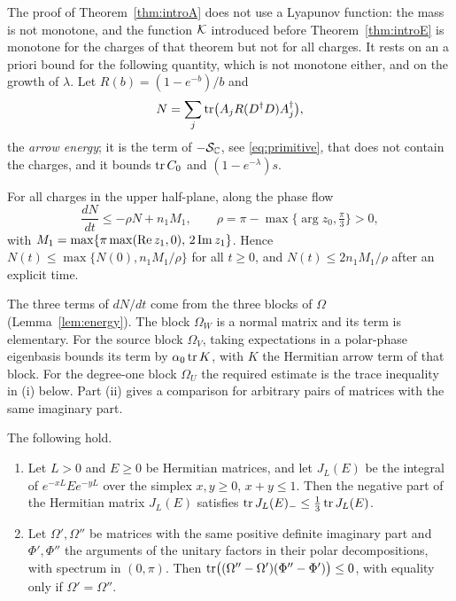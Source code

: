 The proof of Theorem~\ref{thm:introA} does not use a Lyapunov function: the
mass is not monotone, and the function $\mathcal K$ introduced before
Theorem~\ref{thm:introE} is monotone for the charges of that theorem but not
for all charges. It rests on an a priori bound for the
following quantity, which is not monotone either, and on the growth of
$\lambda$. Let $R(b)=(1-e^{-b})/b$ and
\[
 N=\sum_j\operatorname{tr}\bigl(A_jR(D^\dagger D)A_j^\dagger\bigr),
\]
the \emph{arrow energy}; it is the term of $-\mathcal S_{\mathbb C}$, see
\eqref{eq:primitive}, that does not contain the charges, and it bounds $\operatorname{tr} C_0$ and $(1-e^{-\lambda})s$.

\begin{theorem}\label{thm:introC}
For all charges in the upper half-plane, along the phase flow
\[
 \frac{dN}{dt}\leq-\rho N+n_1M_1,\qquad
 \rho=\pi-\max\bigl\{\arg z_0,\tfrac\pi3\bigr\}>0,
\]
with $M_1=\max\{\pi\max(\operatorname{Re} z_1,0),\,2\operatorname{Im} z_1\}$. Hence
$N(t)\leq\max\{N(0),n_1M_1/\rho\}$ for all $t\geq0$, and
$N(t)\leq2n_1M_1/\rho$ after an explicit time.
\end{theorem}

The three terms of $dN/dt$ come from the three blocks of $\Omega$
(Lemma~\ref{lem:energy}). The block $\Omega_W$ is a normal matrix and its
term is elementary. For the source block $\Omega_V$, taking expectations in a polar-phase
eigenbasis bounds its term by $\alpha_0\operatorname{tr} K$, with $K$ the Hermitian arrow
term of that block. For the degree-one block $\Omega_U$ the required
estimate is the trace inequality in (i) below. Part (ii) gives a
comparison for arbitrary pairs of matrices with the same imaginary part.

\begin{theorem}\label{thm:introD}
The following hold.
\begin{enumerate}
\item[(i)] Let $L>0$ and $E\geq0$ be Hermitian matrices, and let $J_L(E)$ be
 the integral of $e^{-xL}Ee^{-yL}$ over the simplex $x,y\geq0$, $x+y\leq1$.
 Then the negative part of the Hermitian matrix $J_L(E)$ satisfies
 $\operatorname{tr} J_L(E)_-\leq\frac13\operatorname{tr} J_L(E)$.
\item[(ii)] Let $\Omega',\Omega''$ be matrices with the same positive
 definite imaginary part and $\Phi',\Phi''$ the arguments of the unitary
 factors in their polar decompositions, with spectrum in $(0,\pi)$. Then
 $\operatorname{tr}\bigl((\Omega''-\Omega')(\Phi''-\Phi')\bigr)\leq0$, with equality only
 if $\Omega'=\Omega''$.
\end{enumerate}
\end{theorem}

